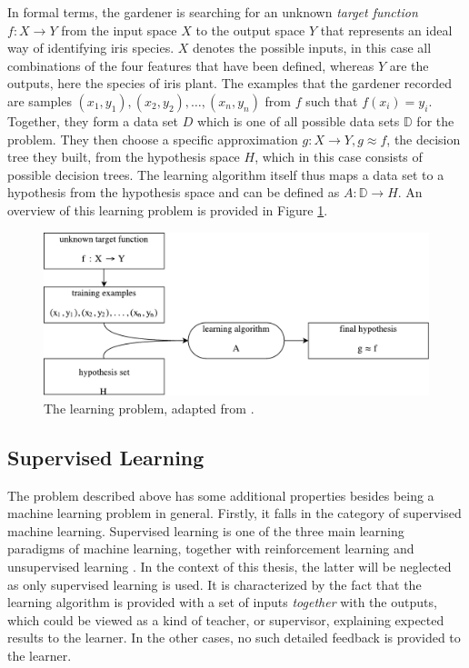 In formal terms, the gardener is searching for an unknown \textit{target function} $f:X \rightarrow Y$ from the input space $X$ to the output space $Y$ \cite{abu2012learning} that represents an ideal way of identifying iris species. $X$ denotes the possible inputs, in this case all combinations of the four features that have been defined, whereas $Y$ are the outputs, here the species of iris plant. The examples that the gardener recorded are samples $(x_1,y_1),(x_2,y_2),\dots,(x_n,y_n)$ from $f$ such that $f(x_i)=y_i$. Together, they form a data set $D$ which is one of all possible data sets $\mathbb{D}$ for the problem. They then choose a specific approximation $g:X \rightarrow Y,g\approx f$, the decision tree they built, from the hypothesis space $H$, which in this case consists of possible decision trees. The learning algorithm itself thus maps a data set to a hypothesis from the hypothesis space and can be defined as $A:\mathbb{D}\rightarrow H$. An overview of this learning problem is provided in Figure \ref{fig:learning_problem}.

\begin{figure}
\centering
\includegraphics[width=\textwidth]{gfx/machine_learning.pdf}
\caption{The learning problem, adapted from \cite{abu2012learning}.}
\label{fig:learning_problem}
\end{figure}

\subsection{Supervised Learning}
The problem described above has some additional properties besides being a machine learning problem in general. Firstly, it falls in the category of supervised machine learning. Supervised learning is one of the three main learning paradigms of machine learning, together with reinforcement learning and unsupervised learning \cite{abu2012learning}. In the context of this thesis, the latter will be neglected as only supervised learning is used. It is characterized by the fact that the learning algorithm is provided with a set of inputs \textit{together} with the outputs, which could be viewed as a kind of teacher, or supervisor, explaining expected results to the learner. In the other cases, no such detailed feedback is provided to the learner. 


